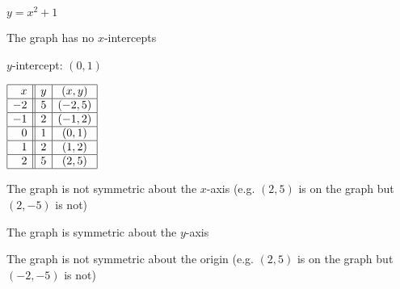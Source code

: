 {$y = x^{2} + 1$}
{The graph has no $x$-intercepts \smallskip

$y$-intercept: $(0, 1)$  \smallskip

$\begin{array}{|r||c|c|}  

\hline
 x & y & (x,y) \\ \hline
-2 & 5 & (-2, 5) \\  \hline
-1 & 2 & (-1, 2) \\ \hline
 0 & 1 & (0, 1) \\ \hline
 1 & 2 & (1, 2) \\ \hline
 2 & 5 & (2, 5) \\ \hline
 
\end{array} $ \smallskip


\smallskip

The graph is not symmetric about the $x$-axis (e.g. $(2, 5)$ is on the graph but $(2, -5)$ is not) \smallskip

The graph is symmetric about the $y$-axis \smallskip

The graph is not symmetric about the origin (e.g. $(2, 5)$ is on the graph but $(-2, -5)$ is not)

}